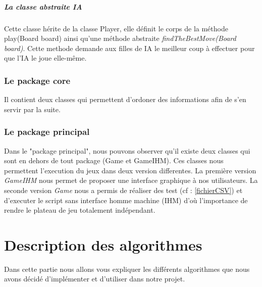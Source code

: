 \documentclass{report}
\begin{document}
              \paragraph{La classe abstraite IA}
              Cette classe hérite de la classe Player, elle définit le corps de la méthode play(Board board) ainsi qu'une méthode abstraite \textit{findTheBestMove(Board board)}.
              Cette methode demande aux filles de IA le meilleur coup à effectuer pour que l'IA le joue elle-même.

			\subsection{Le package core}\label{pckCore}
			Il contient deux classes qui permettent d'ordoner des informations afin de s'en servir par la suite.

			\subsection{Le package principal}
			Dans le "package principal", nous pouvons observer qu'il existe deux classes qui sont en dehors de tout package (Game et GameIHM).
			Ces classes nous permettent l'execution du jeux dans deux version differentes.
			La première version \textit{GameIHM} nous permet de proposer une interface graphique à nos utilisateurs.
			La seconde version \textit{Game} nous a permis de réaliser des test (cf : \ref{fichierCSV}) et d'executer le script sans
			interface homme machine (IHM) d'où l'importance de rendre le plateau de jeu totalement indépendant.

	\chapter{Description des algorithmes}
	Dans cette partie nous allons vous expliquer les différents algorithmes que nous avons décidé d'implémenter et d'utiliser dans notre projet.
\end{document}
